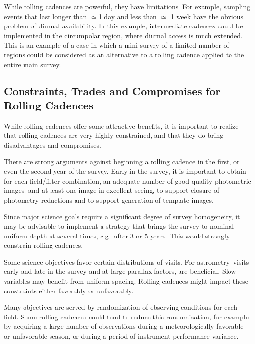 While rolling cadences are powerful, they have limitations.  For
example, sampling events that last longer than $\simeq$1 day and less
than $\simeq$ 1 week have the obvious problem of diurnal availability.
In this example, intermediate cadences could be implemented in the
circumpolar region, where diurnal access is much extended.  This is an
example of a case in which a mini-survey of a limited number of regions
could be considered as an alternative to a rolling cadence applied to
the entire main survey.



\subsection{Constraints, Trades and Compromises for Rolling Cadences}
\label{sec:rolling:trades}

While rolling cadences offer some attractive benefits, it is important
to realize that rolling cadences are very highly constrained, and that
they do bring disadvantages and compromises.

There are strong arguments against beginning a rolling cadence in the
first, or even the second year of the survey.  Early in the survey, it
is important to obtain for each field/filter combination, an adequate
number of good quality photometric images, and at least one image in
excellent seeing, to support closure of photometry reductions and to
support generation of template images.

Since major science goals require a significant degree of survey
homogeneity, it may be advisable to implement a strategy that brings the
survey to nominal uniform depth at several times, e.g.\ after 3 or 5
years.  This would strongly constrain rolling cadences.

Some science objectives favor certain distributions of visits.  For
astrometry, visits early and late in the survey and at large parallax
factors, are beneficial.  Slow variables may benefit from uniform
spacing.  Rolling cadences might impact these constraints either
favorably or unfavorably.

Many objectives are served by randomization of observing conditions for
each field.  Some rolling cadences could tend to reduce this
randomization, for example by acquiring a large number of observations
during a meteorologically favorable or unfavorable season, or during a
period of instrument performance variance.

